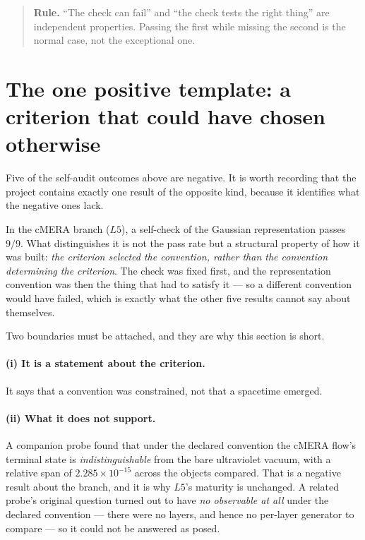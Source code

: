 \documentclass[11pt,a4paper]{article}
\begin{document}
\begin{quote}\small
\textbf{Rule.} ``The check can fail'' and ``the check tests the right thing'' are
independent properties. Passing the first while missing the second is the normal
case, not the exceptional one.
\end{quote}

\section{The one positive template: a criterion that could have chosen otherwise}
\label{sec:positive}

Five of the self-audit outcomes above are negative. It is worth recording that
the project contains exactly one result of the opposite kind, because it
identifies what the negative ones lack.

In the cMERA branch ($L5$), a self-check of the Gaussian representation passes
$9/9$. What distinguishes it is not the pass rate but a structural property of
how it was built: \emph{the criterion selected the convention, rather than the
convention determining the criterion}. The check was fixed first, and the
representation convention was then the thing that had to satisfy it --- so a
different convention would have failed, which is exactly what the other five
results cannot say about themselves.

Two boundaries must be attached, and they are why this section is short.

\paragraph{(i) It is a statement about the criterion.} It says that a convention
was constrained, not that a spacetime emerged.

\paragraph{(ii) What it does not support.} A companion probe found that under the
declared convention the cMERA flow's terminal state is
\emph{indistinguishable} from the bare ultraviolet vacuum, with a relative span
of $2.285\times10^{-15}$ across the objects compared. That is a negative result
about the branch, and it is why $L5$'s maturity is unchanged. A related probe's
original question turned out to have \emph{no observable at all} under the
declared convention --- there were no layers, and hence no per-layer generator
to compare --- so it could not be answered as posed.
\end{document}
